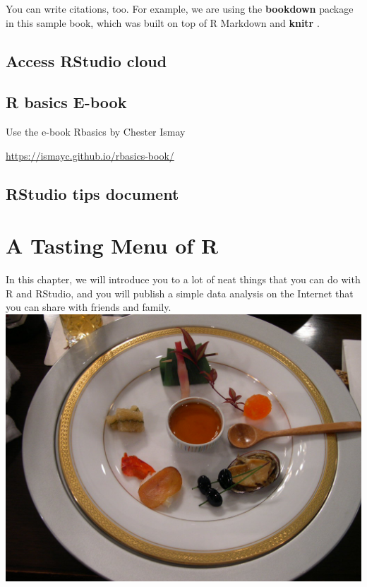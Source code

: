 \documentclass[
]{book}
\begin{document}
You can write citations, too. For example, we are using the \textbf{bookdown} package \citep{R-bookdown} in this sample book, which was built on top of R Markdown and \textbf{knitr} \citep{xie2015}.

\hypertarget{access-rstudio-cloud}{%
\section{Access RStudio cloud}\label{access-rstudio-cloud}}

\hypertarget{r-basics-e-book}{%
\section{R basics E-book}\label{r-basics-e-book}}

Use the e-book Rbasics by Chester Ismay

\url{https://ismayc.github.io/rbasics-book/}

\hypertarget{rstudio-tips-document}{%
\section{RStudio tips document}\label{rstudio-tips-document}}

\hypertarget{a-tasting-menu-of-r}{%
\chapter{A Tasting Menu of R}\label{a-tasting-menu-of-r}}

In this chapter, we will introduce you to a lot of neat things that you can do with R and RStudio, and you will publish a simple data analysis on the Internet
that you can share with friends and family.
\includegraphics{images/tasting.png}
\end{document}
